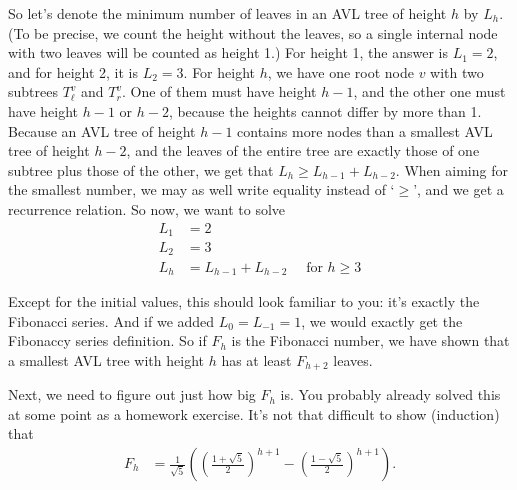 So let's denote the minimum number of leaves in an AVL tree of height
$h$ by $L_h$. 
(To be precise, we count the height without the leaves, so a single
internal node with two leaves will be counted as height 1.)
For height 1, the answer is $L_1=2$, and for height 2, it is $L_2=3$.
For height $h$, we have one root node $v$ with two subtrees
$T^v_{\ell}$ and $T^v_r$. 
One of them must have height $h-1$, and the other one must have height
$h-1$ or $h-2$, because the heights cannot differ by more than 1.
Because an AVL tree of height $h-1$ contains more nodes than a
smallest AVL tree of height $h-2$, and the leaves of the entire tree
are exactly those of one subtree plus those of the other, we get that
$L_{h} \geq  L_{h-1} + L_{h-2}$.
When aiming for the smallest number, we may as well write equality
instead of `$\geq$', and we get a recurrence relation.
So now, we want to solve
\begin{align*}
L_1 & = 2\\
L_2 & = 3\\
L_h & = L_{h-1} + L_{h-2} \quad \text{ for } h \geq 3
\end{align*}

Except for the initial values, this should look familiar to you: it's
exactly the Fibonacci series. And if we added $L_0 = L_{-1} = 1$, 
we would exactly get the Fibonaccy series definition.
So if $F_h$ is the  Fibonacci number, we have shown that
a smallest AVL tree with height $h$ has at least $F_{h+2}$ leaves.

Next, we need to figure out just how big $F_h$ is.
You probably already solved this at some point as a homework exercise.
It's not that difficult to show (induction) that
\begin{align*}
F_h & = \frac{1}{\sqrt{5}} \left( \left( \frac{1+\sqrt{5}}{2} \right)^{h+1}
- \left( \frac{1-\sqrt{5}}{2} \right)^{h+1} \right).
\end{align*}

